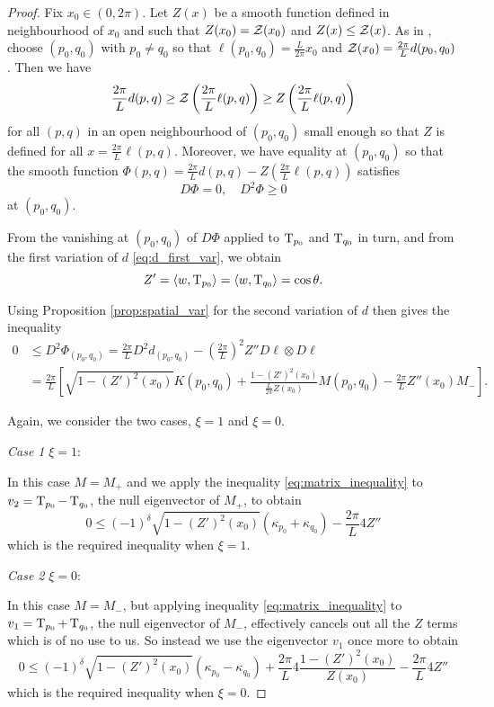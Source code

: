 \documentclass[a4paper, 12pt]{amsart}
\begin{document}
\begin{proof}
Fix $x_0 \in (0,2\pi)$. Let $Z(x)$ be a smooth function defined in neighbourhood of $x_0$ and such that $Z(x_0) = \operatorname{\mathcal{Z}}(x_0)$ and $Z(x) \leq \operatorname{\mathcal{Z}}(x)$. As in , choose $(p_0,q_0)$ with $p_0\ne q_0$ so that $\ell(p_0, q_0) = \tfrac{L}{2\pi} x_0$ and $\operatorname{\mathcal{Z}}(x_0) = \tfrac{2\pi}{L}d(p_0, q_0)$.  Then we have
\[
\frac{2\pi}{L} d(p, q) \geq \operatorname{\mathcal{Z}}\left(\frac{2\pi}{L} \ell(p, q)\right) \geq Z\left(\frac{2\pi}{L}\ell(p, q)\right)
\]
for all $(p,q)$ in an open neighbourhood of $(p_0,q_0)$ small enough so that $Z$ is defined for all $x=\tfrac{2\pi}{L}\ell(p,q)$. Moreover, we have equality at $(p_0, q_0)$ so that the smooth function $\Phi(p, q) = \frac{2\pi}{L} d(p,q) - Z\left(\tfrac{2\pi}{L}\ell(p, q)\right)$ satisfies
\[
D \Phi = 0, \quad D^2\Phi \geq 0
\]
at $(p_0, q_0)$.

From the vanishing at $(p_0,q_0)$ of $D\Phi$ applied to $\operatorname{T}_{p_0}$ and $\operatorname{T}_{q_0}$ in turn, and from the first variation of $d$ \eqref{eq:d_first_var}, we obtain
\begin{equation}
\label{eq:vanishing_first_var}
Z' = \left\langle w,\operatorname{T}_{p_0} \right\rangle = \left\langle w,\operatorname{T}_{q_0} \right\rangle = \cos\theta.
\end{equation}

Using Proposition \ref{prop:spatial_var} for the second variation of \(d\) then gives the inequality
\begin{equation}
\label{eq:matrix_inequality}
\begin{split}
0 &\leq D^2\Phi_{(p_0,q_0)} = \frac{2\pi}{L} D^2 d_{(p_0,q_0)} - \left(\frac{2\pi}{L}\right)^2 Z'' D\ell\otimes D\ell \\
&= \frac{2\pi}{L}\left[\sqrt{1 - (Z')^2(x_0)} K(p_0,q_0) + \frac{1-(Z')^2(x_0)}{\frac{L}{2\pi} Z(x_0)} M (p_0,q_0) - \frac{2\pi}{L} Z''(x_0) M_-\right].
\end{split}
\end{equation}

Again, we consider the two cases, $\xi=1$ and $\xi=0$.

\emph{Case 1} $\xi=1$:

In this case $M=M_+$ and we apply the inequality \eqref{eq:matrix_inequality} to $v_2 = \operatorname{T}_{p_0} - \operatorname{T}_{q_0}$, the null eigenvector of $M_+$, to obtain
\[
0 \leq (-1)^{\delta} \sqrt{1 - (Z')^2(x_0)} (\kappa_{p_0} + \kappa_{q_0}) - \frac{2\pi}{L} 4Z''
\]
which is the required inequality when $\xi=1$.

\emph{Case 2} $\xi=0$:

In this case $M=M_-$, but applying inequality \eqref{eq:matrix_inequality} to $v_1 = \operatorname{T}_{p_0} + \operatorname{T}_{q_0}$, the null eigenvector of $M_-$, effectively cancels out all the $Z$ terms which is of no use to us. So instead we use the eigenvector $v_1$ once more to obtain
\[
0 \leq (-1)^{\delta} \sqrt{1 - (Z')^2(x_0)} (\kappa_{p_0} - \kappa_{q_0}) + \frac{2\pi}{L} 4\frac{1-(Z')^2(x_0)}{Z(x_0)} -\frac{2\pi}{L} 4Z''
\]
which is the required inequality when $\xi=0$.
\end{proof}
\end{document}
